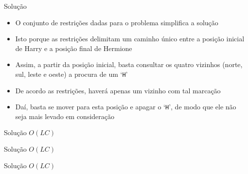 \begin{frame}[fragile]{Solução}

    \begin{itemize}
        \item O conjunto de restrições dadas para o problema simplifica a solução

        \item Isto porque as restrições delimitam um caminho único entre a posição inicial de Harry
            e a posição final de Hermione

        \item Assim, a partir da posição inicial, basta consultar os quatro vizinhos (norte, sul,
            leste e oeste) a procura de um `\texttt{H}'

        \item De acordo as restrições, haverá apenas um vizinho com tal marcação

        \item Daí, basta se mover para esta posição e apagar o `\texttt{H}', de modo que ele não
            seja mais levado em consideração
    \end{itemize}

\end{frame}

\begin{frame}[fragile]{Solução $O(LC)$}
\end{frame}

\begin{frame}[fragile]{Solução $O(LC)$}
\end{frame}

\begin{frame}[fragile]{Solução $O(LC)$}
\end{frame}
